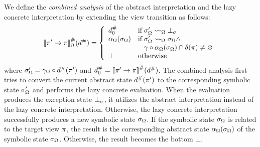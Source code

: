 We define the \textit{combined analysis} of the abstract interpretation and the
lazy concrete interpretation by extending the view transition as follows:
\[
  \viewtrans{\view'}{\view}_\symbset(\abselem) = \left\{
    \begin{array}{ll}
      \abselem_0 & \text{if} \; \symbst' \symbtrans \excst\\
      \alpha_\symbset(\symbst) & \text{if} \; \symbst' \symbtrans \symbst
      \wedge\\
      & \phantom{\text{if}} \; \gamma \circ \alpha_\symbset(\symbst)
      \cap \viewmap(\view) \neq \varnothing\\ \bot & \text{otherwise}\\
    \end{array}
  \right.
\]
where $\sigma_\Omega' = \gamma_\Omega \circ {d}^{\#}(\pi')$ and ${d}^{\#}_0 =
{[\![{\pi' \rightarrow \pi}]\!]}^{\#}({d}^{\#})$.  The combined analysis first tries to
convert the current abstract state ${d}^{\#}(\pi')$ to the corresponding
symbolic state $\sigma_\Omega'$ and performs the lazy concrete evaluation.  When the
evaluation produces the exception state $\bot_\sigma$, it utilizes the abstract
interpretation instead of the lazy concrete interpretation.  Otherwise, the lazy
concrete interpretation successfully produces a new symbolic state $\sigma_\Omega$.
If the symbolic state $\sigma_\Omega$ is related to the target view $\pi$, the
result is the corresponding abstract state $\alpha_\Omega(\sigma_\Omega)$ of the
symbolic state $\sigma_\Omega$. Otherwise, the result becomes the bottom $\bot$.
